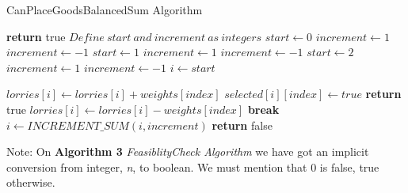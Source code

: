 \documentclass{article}
\begin{document}
\begin{algorithm}
	\caption{CanPlaceGoodsBalancedSum Algorithm}
	\label{algo:canplacegoodsbalancedsum}
	\begin{algorithmic}[1]
		\State \textbf{return} true
		\EndIf
            \State $Define\ \textit{start}\ and\ \textit{increment}\ as\ integers$
            \State $start \gets 0$
            \State $increment \gets 1 $
            \Else \State $increment \gets -1$
            \EndIf
            \Else {}
            \State $start \gets 1$
            \State $increment \gets 1 $
            \Else \State $increment \gets -1$
            \EndIf
            \Else \State $start \gets 2$
            \State $increment \gets 1 $
            \Else \State $increment \gets -1$
            \EndIf
            \EndIf
            \EndIf
            \State $i \gets start$  
            
		\State $lorries[i] \gets lorries[i] + weights[index]$
            \State $selected[i][index] \gets true$
		\State \textbf{return} true
		\EndIf
		\State $lorries[i] \gets lorries[i] - weights[index]$
		\EndIf
		\State \textbf{break}
		\EndIf
  \State $i \gets INCREMENT\_SUM(i,increment)$
		\EndFor
		\State \textbf{return} false
		\EndFunction
	\end{algorithmic}
\end{algorithm}

 Note: On \textbf{Algorithm 3} \textit{FeasiblityCheck Algorithm} we have got an implicit conversion from integer, \textit{n}, to boolean. We must mention that 0 is false, true otherwise.
\end{document}
